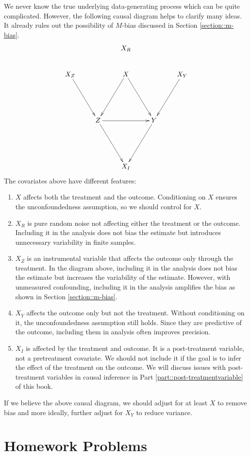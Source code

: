 We never know the true underlying data-generating process which can be quite complicated. However, the following causal diagram helps to clarify many ideas. It already rules out the possibility of $M$-bias discussed in Section \ref{section::m-bias}. 
$$
\xymatrix{
 &&X_R&& \\
X_Z \ar[ddr] && X \ar[ddl] \ar[ddr]&& X_Y \ar[ddl] \\
 &\\
 &Z \ar[rr] \ar[ddr] &&Y \ar[ddl]& \\
 & \\
 &&X_I&&
}
$$
The covariates above have different features: 
\begin{enumerate}
\item
$X$ affects both the treatment and the outcome. Conditioning on $X$ ensures the unconfoundedness assumption, so we should control for $X$.
\item
$X_R$ is pure random noise not affecting either the treatment or the outcome. Including it in the analysis does not bias the estimate but introduces unnecessary variability in finite samples.
\item
$X_Z$ is an instrumental variable that affects the outcome only through the treatment. In the diagram above, including it in the analysis does not bias the estimate but increases the variability of the estimate. However, with unmeasured confounding, including it in the analysis amplifies the bias as shown in Section \ref{section::m-bias}. 
\item
$X_Y$ affects the outcome only but not the treatment. Without conditioning on it, the unconfoundedness assumption still holds. Since they are predictive of the outcome, including them in analysis often improves precision.
\item
$X_I$ is affected by the treatment and outcome. It is a post-treatment variable, not a pretreatment covariate. We should not include it if the goal is to infer the effect of the treatment on the outcome. We will discuss issues with post-treatment variables in causal inference in Part \ref{part::post-treatmentvariable} of this book. 
\end{enumerate}



If we believe the above causal diagram, we should adjust for at least $X$ to remove bias and more ideally, further adjust for $X_Y$ to reduce variance. 


 
 
 
\section{Homework Problems}


